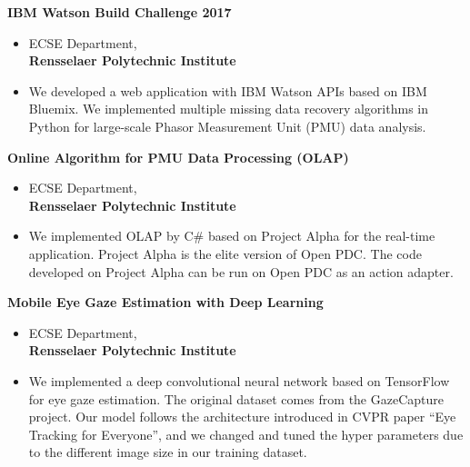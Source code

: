 \documentclass[10pt]{article}
\newenvironment{innerlist}[1][\enskip\textbullet]%
        {\begin{itemize}[#1,leftmargin=*,parsep=0pt,itemsep=0pt,topsep=0pt,partopsep=0pt]}
        {\end{itemize}}
\begin{document}
\textbf{IBM Watson Build Challenge 2017}
\begin{innerlist}
\item[] ECSE Department,\\
\textbf{Rensselaer Polytechnic Institute}
\item We developed a web application with IBM Watson APIs based on IBM Bluemix. We implemented multiple missing data recovery algorithms in Python for large-scale Phasor Measurement Unit (PMU) data analysis.\\
\end{innerlist}

\textbf{Online Algorithm for PMU Data Processing (OLAP)} 
\begin{innerlist}	
\item[] ECSE Department,\\
\textbf{Rensselaer Polytechnic Institute}	
\item We implemented OLAP by C\# based on Project Alpha for the real-time application. Project Alpha is the elite version of Open PDC. The code developed on Project Alpha can be run on Open PDC as an action adapter.\\
\end{innerlist}

\textbf{Mobile Eye Gaze Estimation with Deep Learning} 
\begin{innerlist}	
\item[] ECSE Department,\\
\textbf{Rensselaer Polytechnic Institute}	
\item We implemented a deep convolutional neural network based on TensorFlow for eye gaze estimation. The original dataset comes from the GazeCapture project. Our model follows the architecture introduced in CVPR paper ``Eye Tracking for Everyone'', and we changed and tuned the hyper parameters due to the different image size in our training dataset.\\
\end{innerlist}

\end{document}
